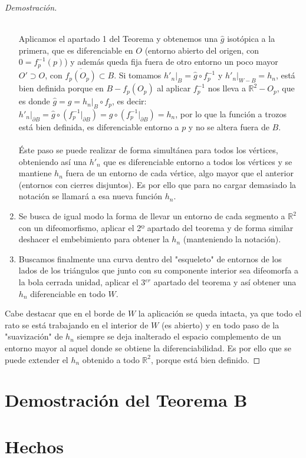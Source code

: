 \documentclass[11pt]{article}
\begin{document}
\begin{proof}[Demostración]
\begin{enumerate}
			\\ Aplicamos el apartado 1 del Teorema y obtenemos una $\widehat{g}$ isotópica a la primera, que es diferenciable en $O$ (entorno abierto del origen, con $0=f_p^{-1}(p)$) y además queda fija fuera de otro entorno un poco mayor $O'\supset O$, con $\overline{f_p(O_p)}\subset B $. Si tomamos $h'_n|_{B}=\widehat{g}\circ f_p^{-1}$ y $h'_n|_{W-B}=h_n$, está bien definida porque en $B-f_p(O_p)$ al aplicar $f_p^{-1}$ nos lleva a $\mathbb{R}^2-O_p$, que es donde $\widehat{g}=g=h_n|_B\circ f_p$, es decir: \\
			$h'_n|_{\partial B}=\widehat{g}\circ(f_p^{-1}|_{\partial B})=g\circ(f_p^{-1}|_{\partial B})=h_n$, por lo que la función a trozos está bien definida, es diferenciable entorno a $p$ y no se altera fuera de $B$. \\
			\\ Éste paso se puede realizar de forma simultánea para todos los vértices, obteniendo así una $h'_n$ que es diferenciable entorno a todos los vértices y se mantiene $h_n$ fuera de un entorno de cada vértice, algo mayor que el anterior (entornos con cierres disjuntos). Es por ello que para no cargar demasiado la notación se llamará a esa nueva función $h_n$.
			\item Se busca de igual modo la forma de llevar un entorno de cada segmento a $\mathbb{R}^2$ con un difeomorfismo, aplicar el 2º apartado del teorema y de forma similar deshacer el embebimiento para obtener la $h_n$ (manteniendo la notación).
			\item Buscamos finalmente una curva dentro del "esqueleto" de entornos de los lados de los triángulos que junto con su componente interior sea difeomorfa a la bola cerrada unidad, aplicar el 3$^{er}$ apartado del teorema y así obtener una $h_n$ diferenciable en todo $W$.
		\end{enumerate}
		
		Cabe destacar que en el borde de $W$ la aplicación se queda intacta, ya que todo el rato se está trabajando en el interior de $W$ (es abierto) y en todo paso de la "suavización" de $h_n$ siempre se deja inalterado el espacio complemento de un entorno mayor al aquel donde se obtiene la diferenciabilidad. Es por ello que se puede extender el $h_n$ obtenido a todo $\mathbb{R}^2$, porque está bien definido. 
	\end{proof}

\section{Demostración del Teorema B}



\section{Hechos}
\end{document}
